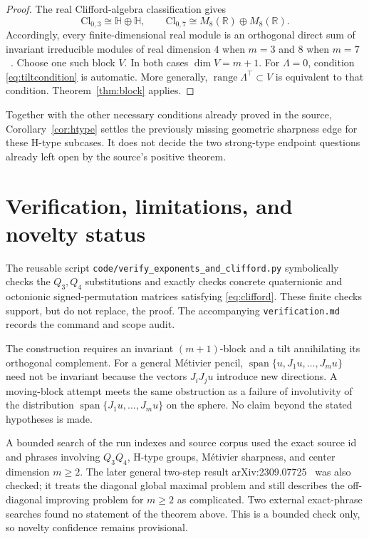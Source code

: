 \documentclass[11pt]{article}
\newcommand{\R}{\mathbb R}
\newcommand{\Cl}{\mathrm{Cl}}
\begin{document}
\begin{proof}
The real Clifford-algebra classification gives
\[
 \Cl_{0,3}\cong\mathbb H\oplus\mathbb H,
 \qquad
 \Cl_{0,7}\cong M_8(\R)\oplus M_8(\R).
\]
Accordingly, every finite-dimensional real module is an orthogonal direct sum
of invariant irreducible modules of real dimension $4$ when $m=3$ and $8$
when $m=7$~\cite{LawsonMichelsohn}.  Choose one such block $V$.  In both
cases $\dim V=m+1$.  For $\Lambda=0$, condition
\eqref{eq:tiltcondition} is automatic.  More generally,
$\operatorname{range}\Lambda^\intercal\subset V$ is equivalent to that
condition.  Theorem~\ref{thm:block} applies.
\end{proof}

Together with the other necessary conditions already proved in the source,
Corollary~\ref{cor:htype} settles the previously missing geometric sharpness
edge for these H-type subcases.  It does not decide the two strong-type
endpoint questions already left open by the source's positive theorem.

\section{Verification, limitations, and novelty status}

The reusable script \texttt{code/verify\_exponents\_and\_clifford.py}
symbolically checks the $Q_3,Q_4$ substitutions and exactly checks concrete
quaternionic and octonionic signed-permutation matrices satisfying
\eqref{eq:clifford}.  These finite checks support, but do not replace, the
proof.  The accompanying \texttt{verification.md} records the command and
scope audit.

The construction requires an invariant $(m+1)$-block and a tilt annihilating
its orthogonal complement.  For a general M\'etivier pencil,
$\operatorname{span}\{u,J_1u,\ldots,J_mu\}$ need not be invariant because
the vectors $J_iJ_ju$ introduce new directions.  A moving-block attempt meets
the same obstruction as a failure of involutivity of the distribution
$\operatorname{span}\{J_1u,\ldots,J_mu\}$ on the sphere.  No claim beyond
the stated hypotheses is made.

A bounded search of the run indexes and source corpus used the exact source
id and phrases involving $Q_3Q_4$, H-type groups, M\'etivier sharpness, and
center dimension $m\geq2$.  The later general two-step result
arXiv:2309.07725~\cite{RyuSeeger} was also checked; it treats the diagonal
global maximal problem and still describes the off-diagonal improving
problem for $m\geq2$ as complicated.  Two external exact-phrase searches
found no statement of the theorem above.  This is a bounded check only, so
novelty confidence remains provisional.
\end{document}
